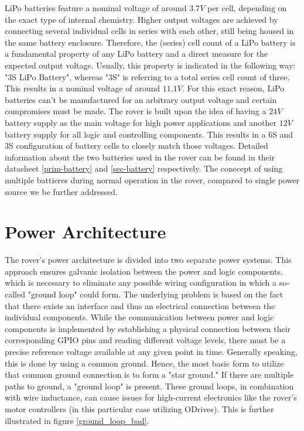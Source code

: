     \vspace{5mm}
    
    LiPo batteries feature a nominal voltage of around $3.7V$ per cell, depending on the exact type of internal chemistry. Higher output voltages are achieved by connecting several individual cells in series with each other, still being housed in the same battery enclosure. Therefore, the (series) cell count of a LiPo battery is a fundamental property of any LiPo battery and a direct measure for the expected output voltage. Usually, this property is indicated in the following way: "3S LiPo Battery", whereas "3S" is referring to a total series cell count of three. This results in a nominal voltage of around $11.1V$. For this exact reason, LiPo batteries can't be manufactured for an arbitrary output voltage and certain compromises must be made. The rover is built upon the idea of having a $24V$ battery supply as the main voltage for high power applications and another $12V$ battery supply for all logic and controlling components. This results in a 6S and 3S configuration of battery cells to closely match those voltages. Detailed information about the two batteries used in the rover can be found in their datasheet \ref{prim-battery} and \ref{sec-battery} respectively. The conecept of using multiple battieres during normal operation in the rover, compared to single power source we be further addressed.

    \clearpage      
    
\section{Power Architecture}

    The rover's power architecture is divided into two separate power systems. This approach ensures galvanic isolation between the power and logic components, which is necessary to eliminate any possible wiring configuration in which a so-called "ground loop" could form. The underlying problem is based on the fact that there exists an interface and thus an electrical connection between the individual components. While the communication between power and logic components is implemented by establishing a physical connection between their corresponding GPIO pins and reading different voltage levels, there must be a precise reference voltage available at any given point in time. Generally speaking, this is done by using a common ground. Hence, the most basic form to utilize that common ground connection is to form a "star ground." If there are multiple paths to ground, a "ground loop" is present. These ground loops, in combination with wire inductance, can cause issues for high-current electronics like the rover's motor controllers (in this particular case utilizing ODrives). This is further illustrated in figure \ref{ground_loop_bad}.
    
